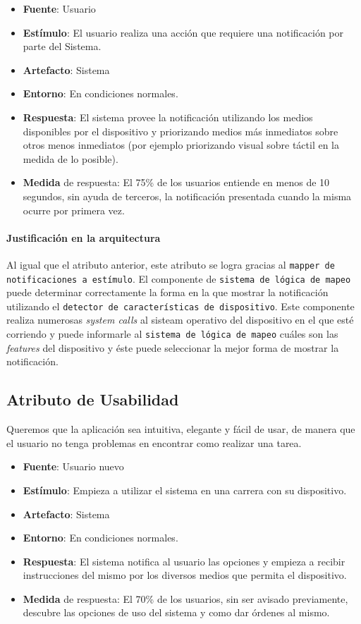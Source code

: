 \begin{itemize}
  \item \textbf{Fuente}: Usuario
  \item \textbf{Estímulo}: El usuario realiza una acción que requiere una notificación por parte del Sistema.
  \item \textbf{Artefacto}: Sistema
  \item \textbf{Entorno}: En condiciones normales.
  \item \textbf{Respuesta}: El sistema provee la notificación utilizando los medios disponibles por el dispositivo y priorizando medios más inmediatos sobre otros menos inmediatos (por ejemplo priorizando visual sobre táctil en la medida de lo posible).
  \item \textbf{Medida} de respuesta: El 75\% de los usuarios entiende en menos de 10 segundos, sin ayuda de terceros, la notificación presentada cuando la misma ocurre por primera vez.
\end{itemize}

\paragraph{Justificación en la arquitectura}
Al igual que el atributo anterior, este atributo se logra gracias al \texttt{mapper de notificaciones a estímulo}. El componente de \texttt{sistema de lógica de mapeo} puede determinar correctamente la forma en la que mostrar la notificación utilizando el \texttt{detector de características de dispositivo}. Este componente realiza numerosas \emph{system calls} al sisteam operativo del dispositivo en el que esté corriendo y puede informarle al \texttt{sistema de lógica de mapeo} cuáles son las \emph{features} del dispositivo y éste puede seleccionar la mejor forma de mostrar la notificación. 


\subsection{Atributo de Usabilidad}
Queremos que la aplicación sea intuitiva, elegante y fácil de usar, de manera que el usuario no tenga problemas en encontrar como realizar una tarea.

\begin{itemize}
  \item \textbf{Fuente}: Usuario nuevo
  \item \textbf{Estímulo}: Empieza a utilizar el sistema en una carrera con su dispositivo.
  \item \textbf{Artefacto}: Sistema
  \item \textbf{Entorno}: En condiciones normales.
  \item \textbf{Respuesta}: El sistema notifica al usuario las opciones y empieza a recibir instrucciones del mismo por los diversos medios que permita el dispositivo.
  \item \textbf{Medida} de respuesta: El 70\% de los usuarios, sin ser avisado previamente, descubre las opciones de uso del sistema y como dar órdenes al mismo.
\end{itemize}


